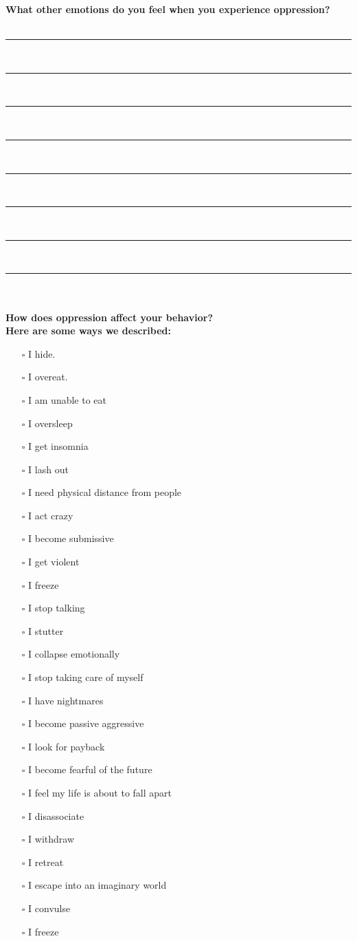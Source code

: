 \newpage
\noindent
\textcolor{ProcessBlue}{\textbf{\Large{What other emotions do you feel when you experience oppression?}}}\\\\
\noindent\rule{\textwidth}{1pt}\\
\noindent\rule{\textwidth}{1pt}\\
\noindent\rule{\textwidth}{1pt}\\
\noindent\rule{\textwidth}{1pt}\\
\noindent\rule{\textwidth}{1pt}\\
\noindent\rule{\textwidth}{1pt}\\
\noindent\rule{\textwidth}{1pt}\\
\noindent\rule{\textwidth}{1pt}\\\\

\noindent\textcolor{ProcessBlue}{\textbf{\Large{How does oppression affect your behavior?}}}\\
\textbf{\large{Here are some ways we described:}}
\begin{multicols}{2}
\begin{itemize}
\item[$\square$]{I hide.}
\item[$\square$]{I overeat.}
\item[$\square$]{I am unable to eat}
\item[$\square$]{I oversleep}
\item[$\square$]{I get insomnia}
\item[$\square$]{I lash out}
\item[$\square$]{I need physical distance from people}
\item[$\square$]{I act crazy}
\item[$\square$]{I become submissive}
\item[$\square$]{I get violent}
\item[$\square$]{I freeze}
\item[$\square$]{I stop talking}
\item[$\square$]{I stutter}
\item[$\square$]{I collapse emotionally}
\item[$\square$]{I stop taking care of myself}
\item[$\square$]{I have nightmares}
\item[$\square$]{I become passive aggressive}
\item[$\square$]{I look for payback}
\item[$\square$]{I become fearful of the future}
\item[$\square$]{I feel my life is about to fall apart}
\item[$\square$]{I disassociate}
\item[$\square$]{I withdraw}
\item[$\square$]{I retreat}
\item[$\square$]{I escape into an imaginary world}
\item[$\square$]{I convulse}
\item[$\square$]{I freeze}
\end{itemize}
\end{multicols}


